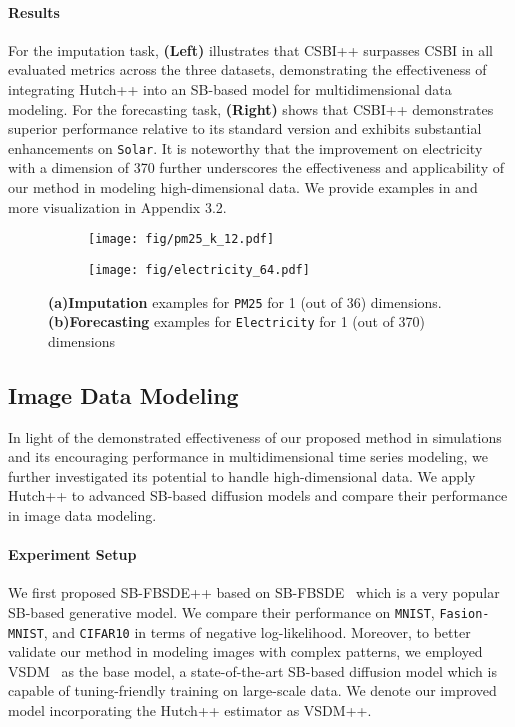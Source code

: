 \paragraph{Results}
For the imputation task,  \textbf{(Left)} illustrates that CSBI++ surpasses CSBI in all evaluated metrics across the three datasets, demonstrating the effectiveness of integrating Hutch++ into an SB-based model for multidimensional data modeling.
For the forecasting task,  \textbf{(Right)} shows that CSBI++ demonstrates superior performance relative to its standard version and exhibits substantial enhancements on \texttt{Solar}. It is noteworthy that the improvement on electricity with a dimension of 370 further underscores the effectiveness and applicability of our method in modeling high-dimensional data.
We provide examples in  and more visualization in Appendix 3.2.
\begin{figure}[!t]
    \centering
    \begin{subfigure}{0.47\linewidth}
        \centering
        \texttt{[image: fig/pm25\_k\_12.pdf]}
        \caption{}
        \label{fig: time_i}
    \end{subfigure}
    \begin{subfigure}{0.47\linewidth}
        \centering
        \texttt{[image: fig/electricity\_64.pdf]}
        \caption{}
        \label{fig: time_f}
    \end{subfigure}
    \vspace{-1mm}
    \caption{\small \textbf{(a)Imputation} examples for \texttt{PM25} for 1 (out of 36) dimensions. \textbf{(b)Forecasting} examples for \texttt{Electricity} for 1 (out of 370) dimensions}
    \vspace{-2mm}
    \label{fig: time}
\end{figure}


\subsection{Image Data Modeling}\label{sec: image}
In light of the demonstrated effectiveness of our proposed method in simulations and its encouraging performance in multidimensional time series modeling, we further investigated its potential to handle high-dimensional data.
We apply Hutch++ to advanced SB-based diffusion models and compare their performance in image data modeling.

\paragraph{Experiment Setup}
We first proposed SB-FBSDE++ based on SB-FBSDE~\citep{forward_backward_SDE} which is a very popular SB-based generative model.
We compare their performance on \texttt{MNIST}, \texttt{Fasion-MNIST}, and \texttt{CIFAR10} in terms of negative log-likelihood. 
Moreover, to better validate our method in modeling images with complex patterns, we employed VSDM~\citep{VSDM} as the base model, a state-of-the-art SB-based diffusion model which is capable of tuning-friendly training on large-scale data.
We denote our improved model incorporating the Hutch++ estimator as VSDM++.


